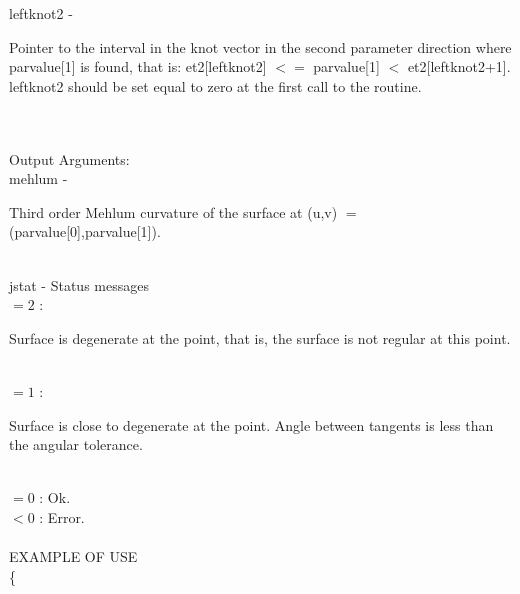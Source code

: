         \>\>    {\fov leftknot2}\> - \>  \begin{minipg2}
                     Pointer to the interval in the knot vector in the
                     second parameter direction where parvalue[1] is found,
                     that is:
                          et2[leftknot2] $<=$ parvalue[1] $<$ et2[leftknot2+1].
                     leftknot2 should be set equal to zero at the first call
                     to the routine.
                               \end{minipg2}\\[0.8ex]
\\
	\>Output Arguments:\\
        \>\>    {\fov mehlum}\> - \>  \begin{minipg2}
                     Third order Mehlum curvature of the surface at (u,v) $=$
                     (parvalue[0],parvalue[1]).
                               \end{minipg2}\\[0.8ex]
        \>\>    {\fov jstat}     \> - \> Status messages\\
                \>\>\>\> $= 2$ : 
                       \> \begin{minipg5}  
                               Surface is degenerate at the point, that is,
                               the surface is not regular at this point.
                               \end{minipg5}\\[0.8ex]
                \>\>\>\>  $= 1$ :
                       \> \begin{minipg5}  
                               Surface is close to degenerate at the point.
                               Angle between tangents is less than the angular
                               tolerance.
                               \end{minipg5}\\[0.8ex]
                \>\>\>\> $= 0$ : \> Ok.\\
                \>\>\>\> $< 0$ : \> Error.\\
\\
EXAMPLE OF USE\\
		\>      \{ \\

